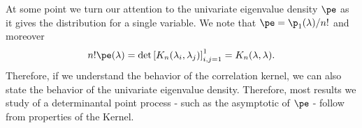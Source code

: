 
 At some point we turn our attention to the univariate eigenvalue density $\pe$ as it gives the distribution for a single variable. We note that $\pe = \p_1(\lambda)/n!$ and moreover
\begin{equation}
	n!\pe(\lambda) = \det\left[ K_n(\lambda_i, \lambda_j) \right]_{i,j=1}^{1} = K_n(\lambda, \lambda).
	\label{Equation: univariate kernel}
\end{equation}
Therefore, if we understand the behavior of the correlation kernel, we can also state the behavior of the univariate eigenvalue density. Therefore, most results we study of a determinantal point process - such as the asymptotic of $\pe$ - follow from properties of the Kernel. 

